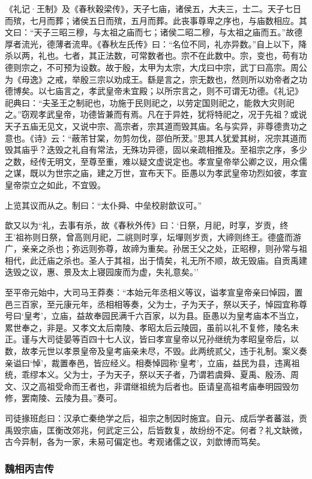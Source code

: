 \documentclass[]{article}
\begin{document}
《礼记·王制》及《春秋穀梁传》，天子七庙，诸侯五，大夫三，士二。天子七日而殡，七月而葬；诸侯五日而殡，五月而葬。此丧事尊卑之序也，与庙数相应。其文曰：``天子三昭三穆，与太祖之庙而七；诸侯二昭二穆，与太祖之庙而五。''故德厚者流光，德薄者流卑。《春秋左氏传》曰：``名位不同，礼亦异数。''自上以下，降杀以两，礼也。七者，其正法数，可常数者也。宗不在此数中。宗，变也，苟有功德则宗之，不可预为设数。故于殷，太甲为太宗，大戊曰中宗，武丁曰高宗。周公为《毋逸》之戒，举殷三宗以劝成王。繇是言之，宗无数也，然则所以劝帝者之功德博矣。以七庙言之，孝武皇帝未宜殿；以所宗言之，则不可谓无功德。《礼记》祀典曰：``夫圣王之制祀也，功施于民则祀之，以劳定国则祀之，能救大灾则祀之。''窃观孝武皇帝，功德皆兼而有焉。凡在于异姓，犹将特祀之，况于先祖？或说天子五庙无见文，又说中宗、高宗者，宗其道而毁其庙。名与实异，非尊德贵功之意也。《诗》云：``蔽芾甘棠，勿剪勿伐，邵伯所茇。''思其人犹爱其树，况宗其道而毁其庙乎？迭毁之礼自有常法，无殊功异德，固以亲疏相推及。至祖宗之序，多少之数，经传无明文，至尊至重，难以疑文虚说定也。孝宣皇帝举公卿之议，用众儒之谋，既以为世宗之庙，建之万世，宣布天下。臣愚以为孝武皇帝功烈如彼，孝宣皇帝崇立之如此，不宜毁。

上览其议而从之。制曰：``太仆舜、中垒校尉歆议可。''

歆又以为``礼，去事有杀，故《春秋外传》曰：`日祭，月祀，时享，岁贡，终王'祖祢则日祭，曾高则月祀，二祧则时享，坛墠则岁贡，大禘则终王。德盛而游广，亲亲之杀也；弥远则弥尊，故禘为重矣。孙居王父之处，正昭穆，则孙常与祖相代，此迁庙之杀也。圣人于其祖，出于情矣，礼无所不顺，故无毁庙。自贡禹建迭毁之议，惠、景及太上寝园废而为虚，失礼意矣。''

至平帝元始中，大司马王莽奏：``本始元年丞相义等议，谥孝宣皇帝亲曰悼园，置邑三百家，至元康元年，丞相相等奏，父为士，子为天子，祭以天子，悼园宜称尊号曰`皇考'，立庙，益故奉园民满千六百家，以为县。臣愚以为皇考庙本不当立，累世奉之，非是。又孝文太后南陵、孝昭太后云陵园，虽前以礼不复修，陵名未正。谨与大司徒晏等百四十七人议，皆曰孝宣皇帝以兄孙继统为孝昭皇帝后，以数，故孝元世以孝景皇帝及皇考庙亲未尽，不毁。此两统贰父，违于礼制。案义奏亲谥曰`悼'，裁置奉邑，皆应经义。相奏悼园称`皇考'，立庙，益民为县，违离祖统，乖缪本义。父为士，子为天子，祭以天子者，乃谓若虞舜、夏禹、殷汤、周文、汉之高祖受命而王者也，非谓继祖统为后者也。臣请皇高祖考庙奉明园毁勿修，罢南陵、云陵为县。''奏可。

司徒掾班彪曰：汉承亡秦绝学之后，祖宗之制因时施宜。自元、成后学者蕃滋，贡禹毁宗庙，匡衡改郊兆，何武定三公，后皆数复，故纷纷不定。何者？礼文缺微，古今异制，各为一家，未易可偏定也。考观诸儒之议，刘歆博而笃矣。

\hypertarget{header-n5338}{%
\subsubsection{魏相丙吉传}\label{header-n5338}}
\end{document}
